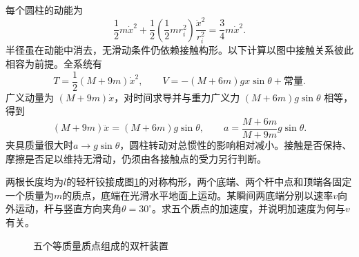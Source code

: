 \begin{solution}
每个圆柱的动能为
\[
 \frac12m\dot x^2+\frac12\left(\frac12mr_i^2\right)
 \frac{\dot x^2}{r_i^2}=\frac34m\dot x^2.
\]
半径虽在动能中消去，无滑动条件仍依赖接触构形。以下计算以图中接触关系彼此相容为前提。全系统有
\[
 T=\frac12(M+9m)\dot x^2,\qquad
 V=-(M+6m)gx\sin\theta+\text{常量}.
\]
广义动量为 $(M+9m)\dot x$，对时间求导并与重力广义力 $(M+6m)g\sin\theta$ 相等，得到
\[
(M+9m)\ddot x=(M+6m)g\sin\theta,
\qquad
 \boxed{a=\frac{M+6m}{M+9m}g\sin\theta}.
\]
夹具质量很大时$a\to g\sin\theta$，圆柱转动对总惯性的影响相对减小。接触是否保持、摩擦是否足以维持无滑动，仍须由各接触点的受力另行判断。


\end{solution}



\begin{example}[五质点双杆的速度项]\label{ex:hw1-3}

两根长度均为$l$的轻杆铰接成图\ref{fig:hw1-3-q}的对称构形，两个底端、两个杆中点和顶端各固定一个质量为$m$的质点，底端在光滑水平地面上运动。某瞬间两底端分别以速率$v$向外运动，杆与竖直方向夹角$\theta=30^\circ$。求五个质点的加速度，并说明加速度为何与$v$有关。

\end{example}


\begin{figure}[H]\centering
{}
\caption{五个等质量质点组成的双杆装置}\label{fig:hw1-3-q}
\end{figure}

